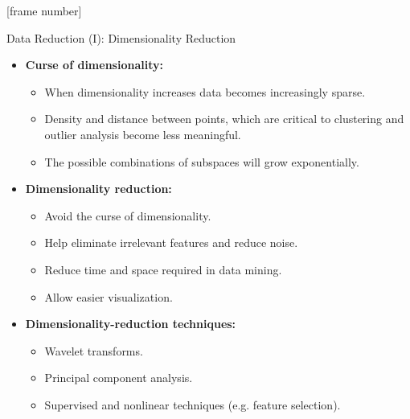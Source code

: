 \documentclass[aspectratio=169,t]{beamer}
\begin{document}
  {
    [frame number]
    \begin{frame}{Data Reduction (I): Dimensionality Reduction}
        \begin{itemize}
            \item \textbf{Curse of dimensionality:}
            \begin{itemize}
              \item When dimensionality increases data becomes increasingly sparse.
              \item Density and distance between points, which are critical to clustering and outlier analysis become less meaningful.
              \item The possible combinations of subspaces will grow exponentially.
            \end{itemize}
            \item \textbf{Dimensionality reduction:}
            \begin{itemize}
              \item Avoid the curse of dimensionality.
              \item Help eliminate irrelevant features and reduce noise.
              \item Reduce time and space required in data mining.
              \item Allow easier visualization.
            \end{itemize}
            \item \textbf{Dimensionality-reduction techniques:}
            \begin{itemize}
              \item Wavelet transforms.
              \item Principal component analysis.
              \item Supervised and nonlinear techniques (e.g. feature selection).
            \end{itemize}
        \end{itemize}
    \end{frame}
  }
\end{document}
